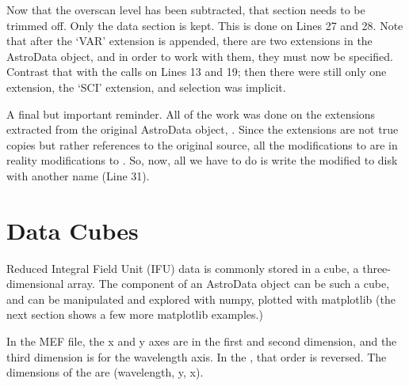 \documentclass[letterpaper,10pt,english]{sphinxmanual}
\begin{document}
Now that the overscan level has been subtracted, that section needs to be
trimmed off.  Only the data section is kept.  This is done on Lines 27 and 28.
Note that after the `VAR' extension is appended, there are two extensions in
the AstroData object, and in order to work with them, they must now be
specified.  Contrast that with the calls on Lines 13 and 19; then there were
still only one extension, the `SCI' extension, and selection was implicit.

A final but important reminder.  All of the work was done on the extensions
extracted from the original AstroData object, .  Since the extensions
are not true copies but rather references to the original source, all the
modifications to  are in reality modifications to .  So, now, all
we have to do is write the modified  to disk with another name (Line 31).


\section{Data Cubes}
\label{data:data-cubes}
Reduced Integral Field Unit (IFU) data is commonly stored in a cube, a
three-dimensional array.  The  component of an AstroData object can
be such a cube, and can be manipulated and explored with numpy, plotted with
matplotlib (the next section shows a few more matplotlib examples.)

In the MEF file, the x and y axes are in the first and second dimension, and
the third dimension is for the wavelength axis. In the , that order
is reversed.  The dimensions of the  are (wavelength, y, x).
\end{document}
